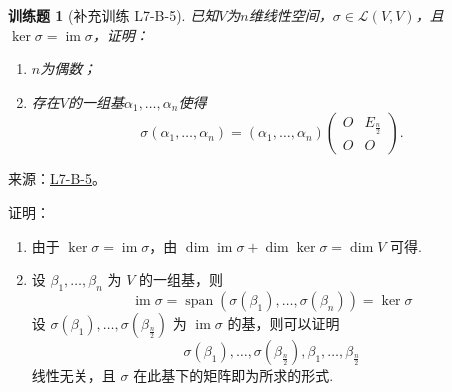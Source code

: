 \documentclass[UTF8,12pt,a4paper,fontset=fandol]{ctexart}
\newtheorem{exercise}{训练题}[section]
\begin{document}
\begin{exercise}[补充训练 L7-B-5]\label{prob:L7-B-5}
已知$V$为$n$维线性空间，$\sigma\in \mathcal{L}(V,V)$，且$\ker\sigma=\operatorname{im} \sigma$，证明：
        \begin{enumerate}
            \item $n$为偶数；

            \item 存在$V$的一组基$\alpha_1,\ldots,\alpha_n$使得
                  \[\sigma(\alpha_1,\ldots,\alpha_n)=(\alpha_1,\ldots,\alpha_n)\begin{pmatrix}
                          O & E_{\frac{n}{2}} \\ O & O
                      \end{pmatrix}.\]
        \end{enumerate}
\end{exercise}
\noindent 来源：\href{https://github.com/yhwu-is/Linear-Algebra-Left-Undone/blob/new/%E8%AE%B2%E4%B9%89/%E4%B8%93%E9%A2%98/7%20%E7%BA%BF%E6%80%A7%E6%98%A0%E5%B0%84%E7%9F%A9%E9%98%B5%E8%A1%A8%E7%A4%BA%E4%B8%8E%E7%9F%A9%E9%98%B5%E8%BF%90%E7%AE%97%E5%9F%BA%E7%A1%80.tex}{L7-B-5}。
\begin{solve}
证明：\begin{enumerate}
                \item 由于 $ \ker \sigma = \operatorname{im} \sigma $，由 $ \dim \operatorname{im} \sigma + \dim \ker \sigma = \dim V $ 可得.

                \item 设 $ \beta_1, \ldots, \beta_n $ 为 $ V $ 的一组基，则
                      \[ \operatorname{im} \sigma = \operatorname{span}(\sigma(\beta_1), \ldots, \sigma(\beta_n)) = \ker \sigma \]
                      设 $ \sigma(\beta_1), \ldots, \sigma(\beta_{\frac{n}{2}}) $ 为 $ \operatorname{im} \sigma $ 的基，则可以证明
                      \[ \sigma(\beta_1), \ldots, \sigma(\beta_{\frac{n}{2}}), \beta_1, \ldots, \beta_{\frac{n}{2}} \]
                      线性无关，且 $ \sigma $ 在此基下的矩阵即为所求的形式.
            \end{enumerate}
\end{solve}
\end{document}
